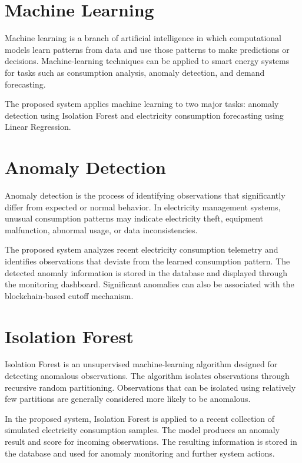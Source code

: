 \section{Machine Learning}

Machine learning is a branch of artificial intelligence in which computational models learn patterns from data and use those patterns to make predictions or decisions. Machine-learning techniques can be applied to smart energy systems for tasks such as consumption analysis, anomaly detection, and demand forecasting.

The proposed system applies machine learning to two major tasks: anomaly detection using Isolation Forest and electricity consumption forecasting using Linear Regression.


\section{Anomaly Detection}

Anomaly detection is the process of identifying observations that significantly differ from expected or normal behavior. In electricity management systems, unusual consumption patterns may indicate electricity theft, equipment malfunction, abnormal usage, or data inconsistencies.

The proposed system analyzes recent electricity consumption telemetry and identifies observations that deviate from the learned consumption pattern. The detected anomaly information is stored in the database and displayed through the monitoring dashboard. Significant anomalies can also be associated with the blockchain-based cutoff mechanism.


\section{Isolation Forest}

Isolation Forest is an unsupervised machine-learning algorithm designed for detecting anomalous observations. The algorithm isolates observations through recursive random partitioning. Observations that can be isolated using relatively few partitions are generally considered more likely to be anomalous.

In the proposed system, Isolation Forest is applied to a recent collection of simulated electricity consumption samples. The model produces an anomaly result and score for incoming observations. The resulting information is stored in the database and used for anomaly monitoring and further system actions.


